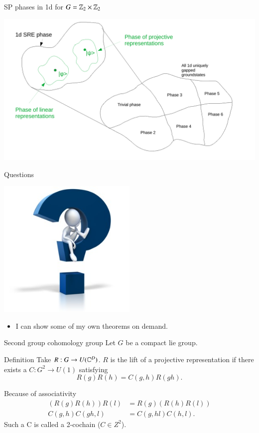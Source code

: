 \documentclass{beamer}
\begin{document}
\begin{frame}{SP phases in 1d for $G=\mathbb{Z}_2\times \mathbb{Z}_2$}
	\begin{center}
		\includegraphics[width=\linewidth]{Figures/SPT_Phases_1d.pdf}
	\end{center}
\end{frame}

\begin{frame}{Questions}
	\begin{center}
		\includegraphics[width=0.5\textwidth]{Figures/AnyQuestions.jpg}
	\end{center}
	\begin{itemize}
		\item I can show some of my own theorems on demand.
	\end{itemize}
\end{frame}

\begin{frame}{Second group cohomology group}
	Let $G$ be a compact lie group.
	\begin{block}{Definition}
		Take $R:G\rightarrow U(\mathbb{C}^D)$. $R$ is the lift of a projective representation if there exists a $C:G^2\rightarrow U(1)$ satisfying
		\[R(g)R(h)=C(g,h)R(gh).\]
	\end{block}
	\pause
	Because of associativity
	\begin{align*}
		(R(g)R(h))R(l)&=R(g)(R(h)R(l))\\
		C(g,h)C(gh,l)&=C(g,hl)C(h,l).
	\end{align*}
	Such a C is called a 2-cochain ($C\in Z^2$).
\end{frame}
\end{document}
